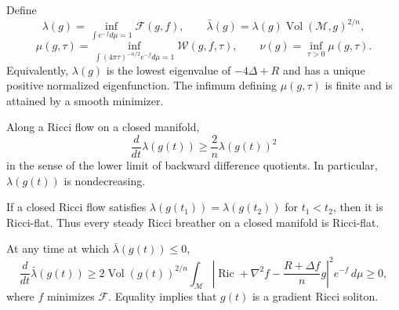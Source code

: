 \begin{definition}
\label{def:chow-ii-appd-perelman-invariants}
Define
\[
 \lambda(g)=\inf_{\int e^{-f}d\mu=1}\mathcal F(g,f),\qquad
 \bar\lambda(g)=\lambda(g)\operatorname{Vol}(\mathcal M,g)^{2/n},
\]
\[
 \mu(g,\tau)=\inf_{\int(4\pi\tau)^{-n/2}e^{-f}d\mu=1}
 \mathcal W(g,f,\tau),\qquad
 \nu(g)=\inf_{\tau>0}\mu(g,\tau).
\]
Equivalently, $\lambda(g)$ is the lowest eigenvalue of $-4\Delta+R$ and
has a unique positive normalized eigenfunction. The infimum defining
$\mu(g,\tau)$ is finite and is attained by a smooth minimizer.
\end{definition}

\begin{lemma}
\label{lem:chow-ii-appd-lambda-monotonicity}
Along a Ricci flow on a closed manifold,
\[
 \frac d{dt}\lambda(g(t))\geq\frac2n\lambda(g(t))^2
\]
in the sense of the lower limit of backward difference quotients. In
particular, $\lambda(g(t))$ is nondecreasing.
\end{lemma}

\begin{lemma}
\label{lem:chow-ii-appd-no-steady-breathers}
If a closed Ricci flow satisfies $\lambda(g(t_1))=\lambda(g(t_2))$ for
$t_1<t_2$, then it is Ricci-flat. Thus every steady Ricci breather on a
closed manifold is Ricci-flat.
\end{lemma}

\begin{lemma}
\label{lem:chow-ii-appd-normalized-lambda-monotonicity}
At any time at which $\bar\lambda(g(t))\leq0$,
\[
 \frac d{dt}\bar\lambda(g(t))\geq
 2\operatorname{Vol}(g(t))^{2/n}\int_{\mathcal M}
 \left|\operatorname{Ric}+\nabla^2f-
 \frac{R+\Delta f}{n}g\right|^2e^{-f}\,d\mu\geq0,
\]
where $f$ minimizes $\mathcal F$. Equality implies that $g(t)$ is a gradient
Ricci soliton.
\end{lemma}

